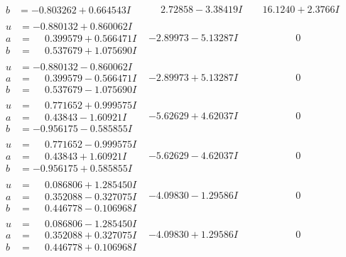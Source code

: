 \documentclass[1p]{elsarticle_modified}
\theoremstyle{definition}
\begin{document}
$$\begin{array}{c|c|c}
\begin{aligned}
b &= -0.803262 + 0.664543 I\end{aligned}
 & \phantom{-}2.72858 - 3.38419 I & \phantom{-}16.1240 + 2.3766 I \\ \hline\begin{aligned}
u &= -0.880132 + 0.860062 I \\
a &= \phantom{-}0.399579 + 0.566471 I \\
b &= \phantom{-}0.537679 + 1.075690 I\end{aligned}
 & -2.89973 - 5.13287 I & \phantom{-0.000000 } 0 \\ \hline\begin{aligned}
u &= -0.880132 - 0.860062 I \\
a &= \phantom{-}0.399579 - 0.566471 I \\
b &= \phantom{-}0.537679 - 1.075690 I\end{aligned}
 & -2.89973 + 5.13287 I & \phantom{-0.000000 } 0 \\ \hline\begin{aligned}
u &= \phantom{-}0.771652 + 0.999575 I \\
a &= \phantom{-}0.43843 - 1.60921 I \\
b &= -0.956175 - 0.585855 I\end{aligned}
 & -5.62629 + 4.62037 I & \phantom{-0.000000 } 0 \\ \hline\begin{aligned}
u &= \phantom{-}0.771652 - 0.999575 I \\
a &= \phantom{-}0.43843 + 1.60921 I \\
b &= -0.956175 + 0.585855 I\end{aligned}
 & -5.62629 - 4.62037 I & \phantom{-0.000000 } 0 \\ \hline\begin{aligned}
u &= \phantom{-}0.086806 + 1.285450 I \\
a &= \phantom{-}0.352088 - 0.327075 I \\
b &= \phantom{-}0.446778 - 0.106968 I\end{aligned}
 & -4.09830 - 1.29586 I & \phantom{-0.000000 } 0 \\ \hline\begin{aligned}
u &= \phantom{-}0.086806 - 1.285450 I \\
a &= \phantom{-}0.352088 + 0.327075 I \\
b &= \phantom{-}0.446778 + 0.106968 I\end{aligned}
 & -4.09830 + 1.29586 I & \phantom{-0.000000 } 0 \\ \hline\begin{aligned}

\end{aligned}
\end{array}$$
\end{document}

